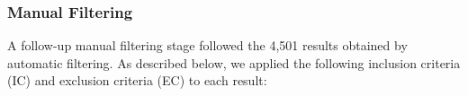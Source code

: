 
\subsubsection{Manual Filtering}

A follow-up manual filtering stage followed the 4,501 results obtained by automatic filtering. As described below, we applied the following inclusion criteria (IC) and exclusion criteria (EC) to each result:

